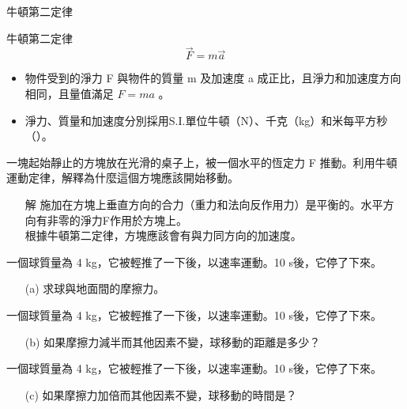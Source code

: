 \documentclass[beamer=true]{standalone}
\begin{document}
\begin{frame}{牛頓第二定律}
    \begin{alertblock}
        {牛頓第二定律}
        \begin{equation}
            \vec{F}=m\vec{a}
        \end{equation}
    \end{alertblock}
    \begin{itemize}

        \item 物件受到的淨力 F 與物件的質量 m 及加速度 a 成正比，且淨力和加速度方向相同，且量值滿足 $F=m a$ 。
        \item 淨力、質量和加速度分別採用S.I.單位牛頓（N）、千克（kg）和米每平方秒（\acc{}）。
    \end{itemize}
\end{frame}

\begin{eg}
    一塊起始靜止的方塊放在光滑的桌子上，被一個水平的恆定力 F 推動。利用牛頓運動定律，解釋為什麼這個方塊應該開始移動。
    \begin{itemize}
        \item [解] 施加在方塊上垂直方向的合力（重力和法向反作用力）是平衡的。水平方向有非零的淨力F作用於方塊上。\\根據牛頓第二定律，方塊應該會有與力同方向的加速度。
    \end{itemize}
\end{eg}

\begin{eg}
    一個球質量為 4 kg，它被輕推了一下後，以速率運動。10 s後，它停了下來。
    \begin{itemize}
        \item[(a)] 求球與地面間的摩擦力。
    \end{itemize}
\end{eg}
\begin{eg}
    一個球質量為 4 kg，它被輕推了一下後，以速率運動。10 s後，它停了下來。
    \begin{itemize}
        \item[(b)] 如果摩擦力減半而其他因素不變，球移動的距離是多少？
    \end{itemize}
\end{eg}
\begin{eg}
    一個球質量為 4 kg，它被輕推了一下後，以速率運動。10 s後，它停了下來。
    \begin{itemize}
        \item[(c)] 如果摩擦力加倍而其他因素不變，球移動的時間是？
    \end{itemize}
\end{eg}
\end{document}
